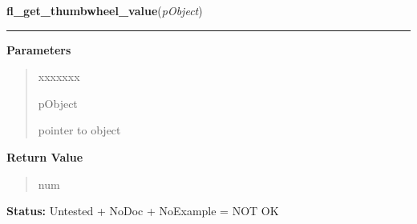     \label{xformslib:library:fl_get_thumbwheel_value}

    \vspace{0.5ex}

\hspace{.8\funcindent}\begin{boxedminipage}{\funcwidth}

    \raggedright \textbf{fl\_get\_thumbwheel\_value}(\textit{pObject})

    \vspace{-1.5ex}

    \rule{\textwidth}{0.5\fboxrule}
\setlength{\parskip}{2ex}
\setlength{\parskip}{1ex}
      \textbf{Parameters}
      \vspace{-1ex}

      \begin{quote}
        \begin{Ventry}{xxxxxxx}

          \item[pObject]

          pointer to object

        \end{Ventry}

      \end{quote}

      \textbf{Return Value}
    \vspace{-1ex}

      \begin{quote}
      num

      \end{quote}

\textbf{Status:} Untested + NoDoc + NoExample = NOT OK



    \end{boxedminipage}

    \label{xformslib:library:fl_set_thumbwheel_value}

    \vspace{0.5ex}

